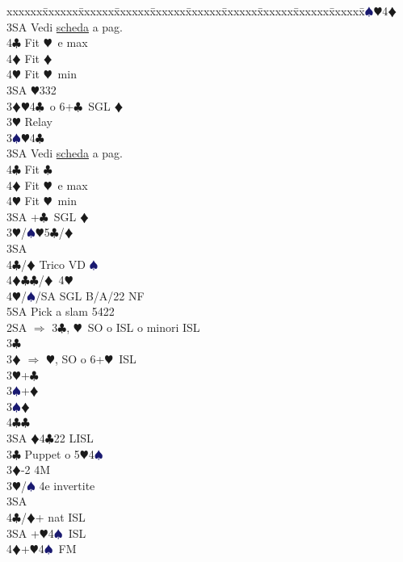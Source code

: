 \documentclass[a4paper,italian]{article}
\newcommand{\BC}{\textcolor{OliveGreen}{$\clubsuit$}}
\newcommand{\BD}{\textcolor{RedOrange}{$\vardiamondsuit$}}
\newcommand{\BH}{\textcolor{Red2}{$\varheartsuit${}}}
\newcommand{\BS}{\textcolor{MidnightBlue}{$\spadesuit${}}}
\newenvironment{bidtable}
{\begin{tabbing}

    xxxxxx\=xxxxxx\=xxxxxx\=xxxxxx\=xxxxxx\=xxxxxx\=xxxxxx\=xxxxxx\=xxxxxx\=xxxxxx\=\kill}
{\end{tabbing} }%
\begin{document}
\begin{multicols}{2}
\begin{bidtable}
        3\BS {}\BH 4\BD \+\\
        3SA\> Vedi \hyperref[Riapertura3SA]{scheda} a pag. \pageref{Riapertura3SA}\\
        4\BC\> Fit \BH\ e max\\
        4\BD\> Fit \BD\\
        4\BH\> Fit \BH\ min\-\\
        3SA \BH 332\-\-\\
        3\BD {}\BH 4\BC\ o 6+\BC\ SGL \BD \+\\
        3\BH \> Relay\+\\
        3\BS {}\BH 4\BC\+\\
        3SA\> Vedi \hyperref[Riapertura3SA]{scheda} a pag. \pageref{Riapertura3SA}\\
        4\BC\> Fit \BC\\
        4\BD\> Fit \BH\ e max\\
        4\BH\> Fit \BH\ min\-\\
        3SA +\BC\ SGL \BD \-\-\\
        3\BH/\BS {}\BH 5\BC /\BD \+\\
        3SA\+\\
        4\BC/\BD \> Trico VD \BS \\
        4\BD\BC {}\BC /\BD\ 4\BH \\
        4\BH/\BS/SA\> \> SGL B/A/22 NF\\
        5SA \> Pick a slam 5422\-\-\-\-\\
        2SA \> $\Rightarrow$ 3\BC , \BH\ SO o ISL o minori ISL\+\\
        3\BC\+\\
        3\BD \> $\Rightarrow$ \BH , SO o 6+\BH\ ISL\\
        3\BH {}+\BC \+\\
        3\BS {}+\BD \-\\
        3\BS {}\BD \+\\
        4\BC {}\BC \-\\
        3SA \BD 4\BC 22 LISL\-\-\\
        3\BC \> Puppet o 5\BH 4\BS \+\\
        3\BD {}-2 4M\+\\
        3\BH/\BS \> 4e invertite\+\\
        3SA\+\\
        4\BC/\BD {}+ nat ISL\-\-\\
        3SA +\BH4\BS\ ISL\\
        4\BD {}+\BH4\BS\ FM\-\\

\end{bidtable}
\end{multicols}
\end{document}
